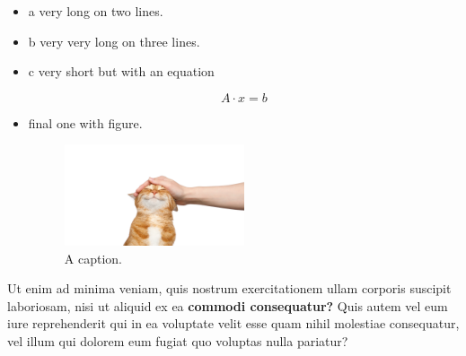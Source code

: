 \begin{itemize}
\item a very long 
on two lines.

\item b very very long 
 on three
 lines.

\item c very short but 
 with an equation 

\begin{equation}
A \cdot x = b
\label{eq:eqinItem}
\end{equation}

\item final one with figure.

\begin{figure}
\centering
\includegraphics[width=0.5\textwidth]{cat.png}
\caption{A caption.}
\end{figure}

\end{itemize}

Ut enim ad minima veniam, quis nostrum exercitationem ullam corporis suscipit laboriosam, nisi ut aliquid ex ea \textbf{commodi consequatur?} Quis autem vel eum iure reprehenderit qui in ea voluptate velit esse quam nihil molestiae consequatur, vel illum qui dolorem eum fugiat quo voluptas nulla pariatur?
